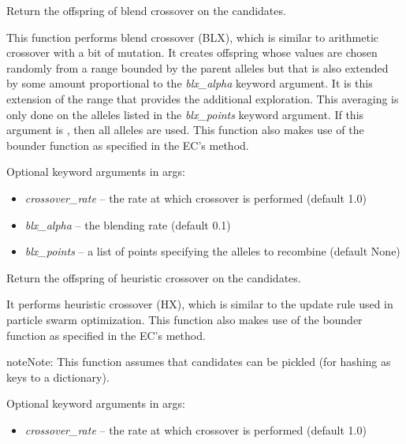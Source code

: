 \documentclass[letterpaper,10pt,english]{sphinxmanual}
\begin{document}
\begin{fulllineitems}
\label{reference:inspyred.ec.variators.blend_crossover}
Return the offspring of blend crossover on the candidates.

This function performs blend crossover (BLX), which is similar to 
arithmetic crossover with a bit of mutation. It creates offspring
whose values are chosen randomly from a range bounded by the
parent alleles but that is also extended by some amount proportional
to the \emph{blx\_alpha} keyword argument. It is this extension of the
range that provides the additional exploration. This averaging is 
only done on the alleles listed in the \emph{blx\_points} keyword argument. 
If this argument is , then all alleles are used. This function 
also makes use of the bounder function as specified in the EC's 
 method.

Optional keyword arguments in args:
\begin{itemize}
\item {} 
\emph{crossover\_rate} -- the rate at which crossover is performed 
(default 1.0)

\item {} 
\emph{blx\_alpha} -- the blending rate (default 0.1)

\item {} 
\emph{blx\_points} -- a list of points specifying the alleles to
recombine (default None)

\end{itemize}

\end{fulllineitems}


\begin{fulllineitems}
\label{reference:inspyred.ec.variators.heuristic_crossover}
Return the offspring of heuristic crossover on the candidates.

It performs heuristic crossover (HX), which is similar to the 
update rule used in particle swarm optimization. This function 
also makes use of the bounder function as specified in the EC's 
 method.

\begin{notice}{note}{Note:}
This function assumes that candidates can be pickled (for hashing 
as keys to a dictionary).
\end{notice}

Optional keyword arguments in args:
\begin{itemize}
\item {} 
\emph{crossover\_rate} -- the rate at which crossover is performed 
(default 1.0)

\end{itemize}

\end{fulllineitems}
\end{document}
